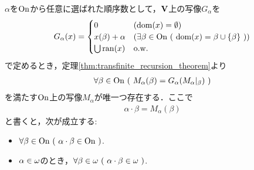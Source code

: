 	\begin{screen}
		\begin{thm}[順序数の乗法]
		\label{thm:the_definition_of_multiplication_of_ordinal_numbers}
			$\alpha$を$\mathrm{On}$から任意に選ばれた順序数として，$\mathbf{V}$上の写像$G_\alpha$を
			\begin{align}
				G_\alpha(x) = 
				\begin{cases}
					0 & (\operatorname{dom}(x) = \emptyset) \\
					x(\beta) + \alpha & (
					\exists \beta \in \mathrm{On}\ (\ \operatorname{dom}(x) = \beta \cup \{\beta\}\ )) \\
					\bigcup \operatorname{ran}(x) & \mathrm{o.w.}
				\end{cases}
			\end{align}
			で定めるとき，定理\ref{thm:transfinite_recursion_theorem}より
			\begin{align}
				\forall \beta \in \mathrm{On}\ (\ M_\alpha(\beta) = G_\alpha(M_\alpha|_\beta)\ )
			\end{align}
			を満たす$\mathrm{On}$上の写像$M_\alpha$が唯一つ存在する．ここで
			\begin{align}
				\alpha \cdot \beta = M_\alpha (\beta)
			\end{align}
			と書くと，次が成立する:
			\begin{itemize}
				\item $\forall \beta \in \mathrm{On}\ (\ \alpha \cdot \beta \in \mathrm{On}\ )$.
				\item $\alpha \in {\bf \omega}$のとき，$\forall \beta \in {\bf \omega}\ 
				(\ \alpha \cdot \beta \in {\bf \omega}\ )$.
			\end{itemize}
		\end{thm}
	\end{screen}
	
	